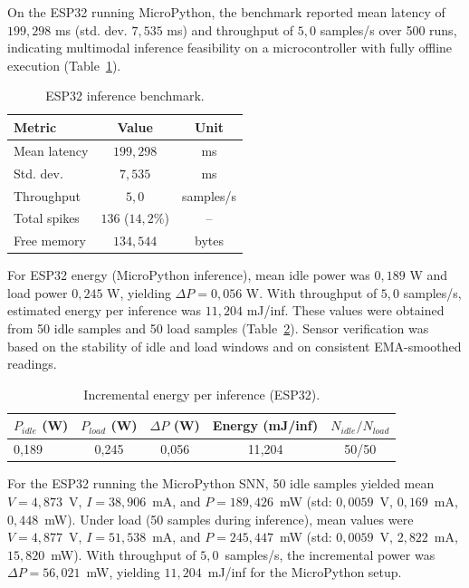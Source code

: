 On the ESP32 running MicroPython, the benchmark reported mean latency of
$199{,}298$ ms (std. dev. $7{,}535$ ms) and throughput of $5{,}0$ samples/s over
500 runs, indicating multimodal inference feasibility on a microcontroller with
fully offline execution (Table~\ref{tab:esp32_benchmark}).

\begin{table}[ht!]
\centering
\caption{ESP32 inference benchmark.}
\begin{tabular}{lcc}
\toprule
Metric & Value & Unit \\
\midrule
Mean latency & $199{,}298$ & ms \\
Std. dev. & $7{,}535$ & ms \\
Throughput & $5{,}0$ & samples/s \\
Total spikes & $136$ ($14{,}2\%$) & -- \\
Free memory & $134{,}544$ & bytes \\
\bottomrule
\end{tabular}
\label{tab:esp32_benchmark}
\end{table}

For ESP32 energy (MicroPython inference), mean idle power was $0{,}189$ W and load power
$0{,}245$ W, yielding $\Delta P=0{,}056$ W. With throughput of $5{,}0$ samples/s,
estimated energy per inference was $11{,}204$ mJ/inf. These values were obtained from
50 idle samples and 50 load samples (Table~\ref{tab:energy_esp32}). Sensor verification
was based on the stability of idle and load windows and on consistent EMA-smoothed readings.

\begin{table}[H]
\centering
\caption{Incremental energy per inference (ESP32).}
\begin{tabular}{lcccc}
\toprule
$P_{idle}$ (W) & $P_{load}$ (W) & $\Delta P$ (W) & Energy (mJ/inf) & $N_{idle}/N_{load}$ \\
\midrule
0{,}189 & 0{,}245 & 0{,}056 & 11{,}204 & 50/50 \\
\bottomrule
\end{tabular}
\label{tab:energy_esp32}
\end{table}

For the ESP32 running the MicroPython SNN, 50 idle samples yielded mean
$V=4{,}873$~V, $I=38{,}906$~mA, and $P=189{,}426$~mW (std: $0{,}0059$~V,
$0{,}169$~mA, $0{,}448$~mW). Under load (50 samples during inference),
mean values were $V=4{,}877$~V, $I=51{,}538$~mA, and $P=245{,}447$~mW
(std: $0{,}0059$~V, $2{,}822$~mA, $15{,}820$~mW). With throughput of
$5{,}0$~samples/s, the incremental power was $\Delta P=56{,}021$~mW,
yielding $11{,}204$~mJ/inf for the MicroPython setup.

